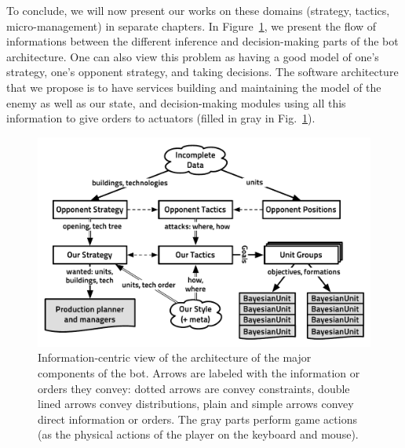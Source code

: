 To conclude, we will now present our works on these domains (strategy, tactics, micro-management) in separate chapters. In Figure~\ref{fig:conceptbbq}, we present the flow of informations between the different inference and decision-making parts of the bot architecture. One can also view this problem as having a good model of one's strategy, one's opponent strategy, and taking decisions. The software architecture that we propose is to have services building and maintaining the model of the enemy as well as our state, and decision-making modules using all this information to give orders to actuators (filled in gray in Fig.~\ref{fig:conceptbbq}).

\begin{figure}[!ht]
\begin{center}
\includegraphics[width=13cm]{images/starcraft_bbq_concept.pdf}
\end{center}
\label{fig:conceptbbq}
\caption{Information-centric view of the architecture of the major components of the bot. Arrows are labeled with the information or orders they convey: dotted arrows are convey constraints, double lined arrows convey distributions, plain and simple arrows convey direct information or orders. The gray parts perform game actions (as the physical actions of the player on the keyboard and mouse).}
\end{figure}


